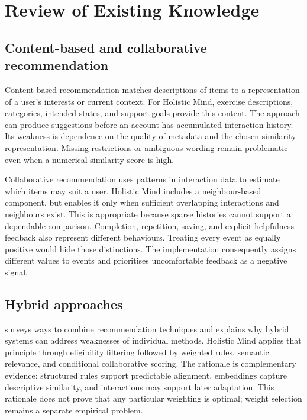 \section{Review of Existing Knowledge}\label{sec:chapter-2}

\subsection{Content-based and collaborative recommendation}

Content-based recommendation matches descriptions of items to a representation of a user's interests or current context. For Holistic Mind, exercise descriptions, categories, intended states, and support goals provide this content. The approach can produce suggestions before an account has accumulated interaction history. Its weakness is dependence on the quality of metadata and the chosen similarity representation. Missing restrictions or ambiguous wording remain problematic even when a numerical similarity score is high.

Collaborative recommendation uses patterns in interaction data to estimate which items may suit a user. Holistic Mind includes a neighbour-based component, but enables it only when sufficient overlapping interactions and neighbours exist. This is appropriate because sparse histories cannot support a dependable comparison. Completion, repetition, saving, and explicit helpfulness feedback also represent different behaviours. Treating every event as equally positive would hide those distinctions. The implementation consequently assigns different values to events and prioritises uncomfortable feedback as a negative signal.

\subsection{Hybrid approaches}

\citet{burke2002} surveys ways to combine recommendation techniques and explains why hybrid systems can address weaknesses of individual methods. Holistic Mind applies that principle through eligibility filtering followed by weighted rules, semantic relevance, and conditional collaborative scoring. The rationale is complementary evidence: structured rules support predictable alignment, embeddings capture descriptive similarity, and interactions may support later adaptation. This rationale does not prove that any particular weighting is optimal; weight selection remains a separate empirical problem.

